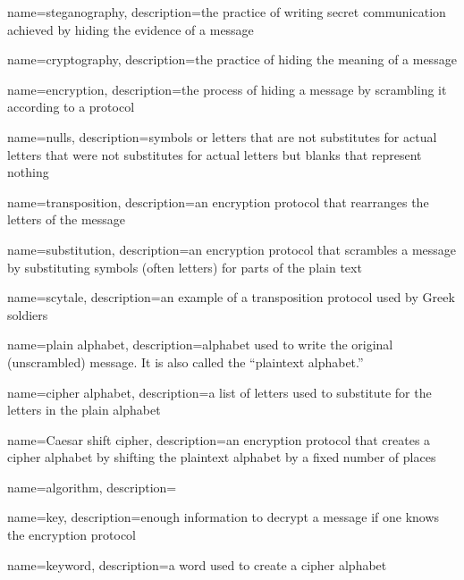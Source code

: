 {
    name=steganography,
    description={the practice of writing secret communication achieved by hiding the evidence of a message}
}

{
    name=cryptography,
    description={the practice of hiding the meaning of a message}
}

{
    name={encryption},
    description={the process of hiding a message by scrambling it according to a protocol}
}

{
    name={nulls},
    description={symbols or letters that are not substitutes for actual letters that were not substitutes for actual letters but blanks that represent nothing}
}

    
{
    name={transposition},
    description={an encryption protocol that rearranges the letters of the message}
}

{
    name={substitution},
    description={an encryption protocol that scrambles a message by substituting symbols (often letters) for parts of the plain text}
}

{
    name={scytale},
    description={an example of a transposition protocol used by Greek soldiers}
}

{
    name={plain alphabet},
    description={alphabet used to write the original (unscrambled) message.  It is also called the ``plaintext alphabet.'' }
}

{
    name={cipher alphabet},
    description={a list of letters used to substitute for the letters in the plain alphabet}
}

{
    name={Caesar shift cipher},
    description={an encryption protocol that creates a cipher alphabet by shifting the plaintext alphabet by a fixed number of places}
}

{
    name={algorithm},
    description={ }
}

{
    name={key},
    description={enough information to decrypt a message if one knows the encryption protocol}
}

{
    name={keyword},
    description={a word used to create a cipher alphabet}
}

